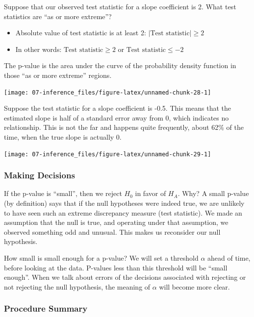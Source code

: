 \documentclass[
]{book}
\providecommand{\tightlist}{%
  \setlength{\itemsep}{0pt}\setlength{\parskip}{0pt}}
\begin{document}
Suppose that our observed test statistic for a slope coefficient is 2. What test statistics are ``as or more extreme''?

\begin{itemize}
\tightlist
\item
  Absolute value of test statistic is at least 2: \(|\text{Test statistic}| \geq 2\)
\item
  In other words: \(\text{Test statistic} \geq 2\) or \(\text{Test statistic} \leq -2\)
\end{itemize}

The p-value is the area under the curve of the probability density function in those ``as or more extreme'' regions.

\begin{center}\texttt{[image: 07-inference\_files/figure-latex/unnamed-chunk-28-1]} \end{center}

Suppose the test statistic for a slope coefficient is -0.5. This means that the estimated slope is half of a standard error away from 0, which indicates no relationship. This is not the far and happens quite frequently, about 62\% of the time, when the true slope is actually 0.

\begin{center}\texttt{[image: 07-inference\_files/figure-latex/unnamed-chunk-29-1]} \end{center}

\subsubsection{Making Decisions}\label{making-decisions}

If the p-value is ``small'', then we reject \(H_0\) in favor of \(H_A\). Why? A small p-value (by definition) says that if the null hypotheses were indeed true, we are unlikely to have seen such an extreme discrepancy measure (test statistic). We made an assumption that the null is true, and operating under that assumption, we observed something odd and unusual. This makes us reconsider our null hypothesis.

How small is small enough for a p-value? We will set a threshold \(\alpha\) ahead of time, before looking at the data. P-values less than this threshold will be ``small enough''. When we talk about errors of the decisions associated with rejecting or not rejecting the null hypothesis, the meaning of \(\alpha\) will become more clear.

\subsubsection{Procedure Summary}\label{procedure-summary}
\end{document}

